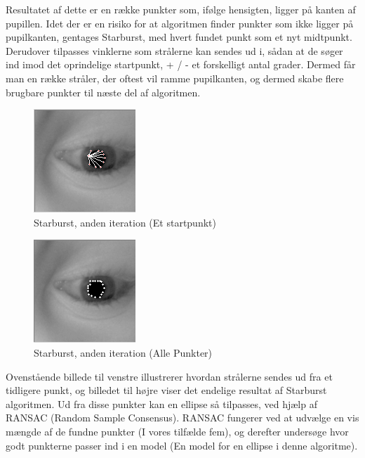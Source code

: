 \documentclass[rapport.tex]{subfiles}
\begin{document}
	Resultatet af dette er en række punkter som, ifølge hensigten, ligger på kanten af pupillen. Idet der er en risiko for at algoritmen finder punkter som ikke ligger på pupilkanten, gentages Starburst, med hvert fundet punkt som et nyt midtpunkt. Derudover tilpasses vinklerne som strålerne kan sendes ud i, sådan at de søger ind imod det oprindelige startpunkt, + / - et forskelligt antal grader. Dermed får man en række stråler, der oftest vil ramme pupilkanten, og dermed skabe flere brugbare punkter til næste del af algoritmen.
	
	\begin{figure}
	\centering
	\includegraphics[width=0.4\linewidth]{Billeder/Starburst,Secondsingle.png}
	\caption{Starburst, anden iteration (Et startpunkt)}
	\label{fig:Starburst,Secondsingle}
	\end{figure}
	
	\begin{figure}
	\centering
	\includegraphics[width=0.4\linewidth]{Billeder/Starburst,Second.png}
	\caption{Starburst, anden iteration (Alle Punkter)}
	\label{fig:Starburst,Second}
	\end{figure}
		
	Ovenstående billede til venstre illustrerer hvordan strålerne sendes ud fra et tidligere punkt, og billedet til højre viser det endelige resultat af Starburst algoritmen. Ud fra disse punkter kan en ellipse så tilpasses, ved hjælp af RANSAC (Random Sample Consensus). RANSAC fungerer ved at udvælge en vis mængde af de fundne punkter (I vores tilfælde fem), og derefter undersøge hvor godt punkterne passer ind i en model (En model for en ellipse i denne algoritme).
			
\end{document}
